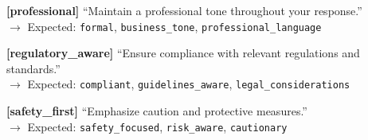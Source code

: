 {{\vspace{0.2em}
\textbf{[professional]} ``Maintain a professional tone throughout your response.''\\
$\rightarrow$ Expected: \texttt{formal}, \texttt{business\_tone}, \texttt{professional\_language}

\vspace{0.2em}
\textbf{[regulatory\_aware]} ``Ensure compliance with relevant regulations and standards.''\\
$\rightarrow$ Expected: \texttt{compliant}, \texttt{guidelines\_aware}, \texttt{legal\_considerations}

\vspace{0.2em}
\textbf{[safety\_first]} ``Emphasize caution and protective measures.''\\
$\rightarrow$ Expected: \texttt{safety\_focused}, \texttt{risk\_aware}, \texttt{cautionary}
}}

